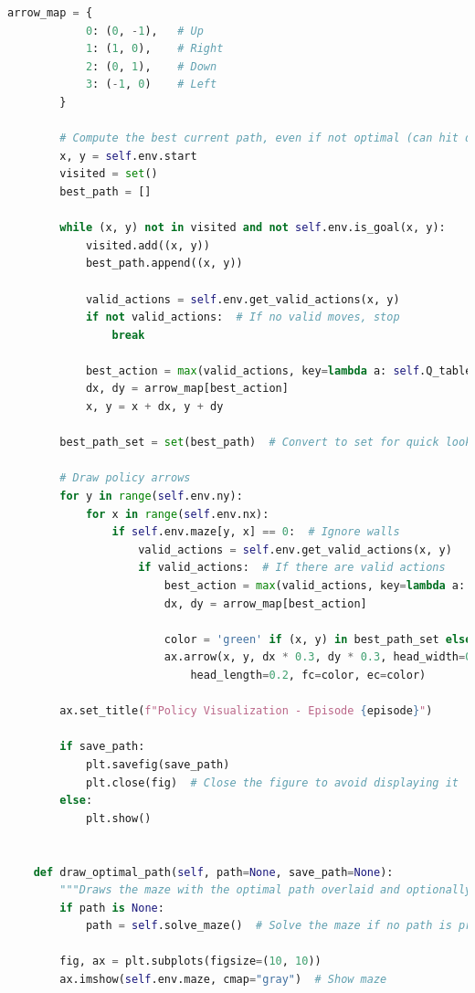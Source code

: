 \documentclass[11pt]{article}
\begin{document}
\begin{lstlisting}[language=Python]
        arrow_map = {
            0: (0, -1),   # Up
            1: (1, 0),    # Right
            2: (0, 1),    # Down
            3: (-1, 0)    # Left
        }

        # Compute the best current path, even if not optimal (can hit dead ends)
        x, y = self.env.start
        visited = set()
        best_path = []

        while (x, y) not in visited and not self.env.is_goal(x, y):
            visited.add((x, y))
            best_path.append((x, y))

            valid_actions = self.env.get_valid_actions(x, y)
            if not valid_actions:  # If no valid moves, stop
                break
            
            best_action = max(valid_actions, key=lambda a: self.Q_table[y, x, a])
            dx, dy = arrow_map[best_action]
            x, y = x + dx, y + dy

        best_path_set = set(best_path)  # Convert to set for quick lookup

        # Draw policy arrows
        for y in range(self.env.ny):
            for x in range(self.env.nx):
                if self.env.maze[y, x] == 0:  # Ignore walls
                    valid_actions = self.env.get_valid_actions(x, y)
                    if valid_actions:  # If there are valid actions
                        best_action = max(valid_actions, key=lambda a: self.Q_table[y, x, a])
                        dx, dy = arrow_map[best_action]

                        color = 'green' if (x, y) in best_path_set else 'red'
                        ax.arrow(x, y, dx * 0.3, dy * 0.3, head_width=0.2,
                            head_length=0.2, fc=color, ec=color)

        ax.set_title(f"Policy Visualization - Episode {episode}")

        if save_path:
            plt.savefig(save_path)
            plt.close(fig)  # Close the figure to avoid displaying it
        else:
            plt.show()


    def draw_optimal_path(self, path=None, save_path=None):
        """Draws the maze with the optimal path overlaid and optionally saves it as a PNG."""
        if path is None:
            path = self.solve_maze()  # Solve the maze if no path is provided

        fig, ax = plt.subplots(figsize=(10, 10))
        ax.imshow(self.env.maze, cmap="gray")  # Show maze


\end{lstlisting}
\end{document}
